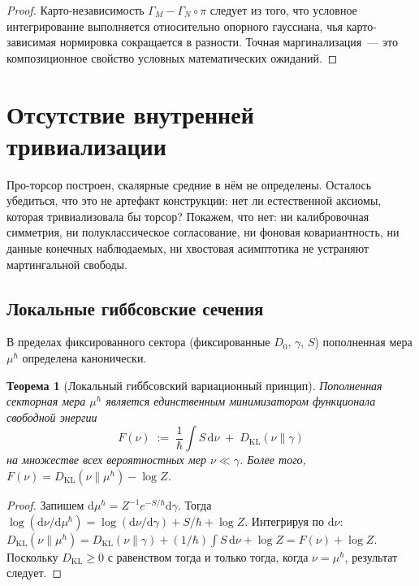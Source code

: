 \documentclass[12pt,a4paper]{article}
\theoremstyle{plain}
\newtheorem{theorem}{Теорема}[section]
\theoremstyle{definition}
\theoremstyle{remark}
\newcommand{\dd}{\mathrm{d}}
\newcommand{\DKL}{D_{\mathrm{KL}}}
\begin{document}
\begin{proof}
Карто-независимость $\Gamma_M - \Gamma_N\circ\pi$ следует из
того, что условное интегрирование выполняется относительно
опорного гауссиана, чья карто-зависимая нормировка сокращается
в разности.  Точная маргинализация~--- это композиционное
свойство условных математических ожиданий.
\end{proof}


\section{Отсутствие внутренней тривиализации}
\label{sec:no-go}

Про-торсор построен, скалярные средние в нём не определены. Осталось убедиться, что это не артефакт конструкции: нет ли естественной аксиомы, которая тривиализовала бы торсор? Покажем, что нет: ни калибровочная симметрия, ни полуклассическое согласование, ни фоновая ковариантность, ни данные конечных наблюдаемых, ни хвостовая асимптотика не устраняют мартингальной свободы.

\subsection{Локальные гиббсовские сечения}

В пределах фиксированного сектора (фиксированные $D_0$, $\gamma$, $S$)
пополненная мера $\mu^\hbar$ определена канонически.

\begin{theorem}[Локальный гиббсовский вариационный принцип]
\label{thm:gibbs}
Пополненная секторная мера $\mu^\hbar$ является единственным минимизатором
функционала свободной энергии
\begin{equation}
  F(\nu) \;:=\; \frac{1}{\hbar}\int S\,\dd\nu
  \;+\; \DKL(\nu\|\gamma)
\end{equation}
на множестве всех вероятностных мер $\nu \ll \gamma$.
Более того, $F(\nu) = \DKL(\nu\|\mu^\hbar) - \log Z$.
\end{theorem}

\begin{proof}
Запишем $\dd\mu^\hbar = Z^{-1}e^{-S/\hbar}\dd\gamma$.  Тогда
$\log(\dd\nu/\dd\mu^\hbar) = \log(\dd\nu/\dd\gamma) + S/\hbar +
\log Z$.  Интегрируя по $\dd\nu$:
$\DKL(\nu\|\mu^\hbar) = \DKL(\nu\|\gamma) + (1/\hbar)\int S\,\dd\nu
+ \log Z = F(\nu) + \log Z$.  Поскольку $\DKL \ge 0$ с равенством
тогда и только тогда, когда $\nu = \mu^\hbar$, результат следует.
\end{proof}
\end{document}
